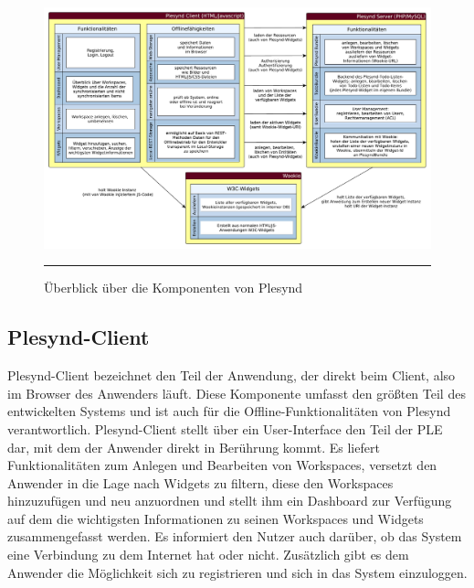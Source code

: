 \begin{landscape}
\begin{figure}
  \centering
  \includegraphics[height=\textheight,keepaspectratio]{./Figures/konzeptionelle_loesung_table.pdf}
    \rule{35em}{0.5pt}
  \caption[Überblick über die Komponenten von Plesynd]{Überblick über die Komponenten von Plesynd}
  \label{fig:ueberblick_plesynd_komponenten}
\end{figure}
\end{landscape}

\subsection{Plesynd-Client}
Plesynd-Client bezeichnet den Teil der Anwendung, der direkt beim Client, also im Browser des Anwenders läuft. Diese Komponente umfasst den größten Teil des entwickelten Systems und ist auch für die Offline-Funktionalitäten von Plesynd verantwortlich. Plesynd-Client stellt über ein User-Interface den Teil der PLE dar, mit dem der Anwender direkt in Berührung kommt. Es liefert Funktionalitäten zum Anlegen und Bearbeiten von Workspaces, versetzt den Anwender in die Lage nach Widgets zu filtern, diese den Workspaces hinzuzufügen und neu anzuordnen und stellt ihm ein Dashboard zur Verfügung auf dem die wichtigsten Informationen zu seinen Workspaces und Widgets zusammengefasst werden. Es informiert den Nutzer auch darüber, ob das System eine Verbindung zu dem Internet hat oder nicht. Zusätzlich gibt es dem Anwender die Möglichkeit sich zu registrieren und sich in das System einzuloggen. 

